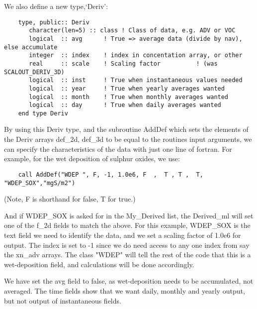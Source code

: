    We also define a new type,`Deriv':

  \begin{small}\begin{verbatim}
    type, public:: Deriv
       character(len=5) :: class ! Class of data, e.g. ADV or VOC
       logical  :: avg      ! True => average data (divide by nav), else accumulate
       integer  :: index    ! index in concentation array, or other
       real     :: scale    ! Scaling factor          ! (was SCALOUT_DERIV_3D)
       logical  :: inst     ! True when instantaneous values needed
       logical  :: year     ! True when yearly averages wanted
       logical  :: month    ! True when monthly averages wanted
       logical  :: day      ! True when daily averages wanted
    end type Deriv
  \end{verbatim}
  \end{small}


  By using this Deriv type, and the subroutine AddDef which sets the elements of the
  Deriv arrays
  def\_2d, def\_3d to be equal to the routines input arguments, we can specify the characteristics of the data
  with just one line of fortran. For example, for the wet deposition of
  sulphur oxides, we use:


  \begin{small}\begin{verbatim}
    call AddDef("WDEP ", F, -1, 1.0e6, F  ,  T , T ,  T, "WDEP_SOX","mgS/m2")
  \end{verbatim}
  \end{small}

  (Note, F is shorthand for false, T for true.)\\
  \bigskip


 \noindent
  And if WDEP\_SOX is asked for in the My\_Derived list, the Derived\_ml will
  set one of the f\_2d fields to match the above.
  For this example, WDEP\_SOX is the text field we need to identify the
  data, and we set a scaling factor of 1.0e6 for output. The index
  is set to -1 since we do need access to any one index from say 
  the xn\_adv arrays.
   The class
  "WDEP" will tell the rest of the code that this is a wet-deposition field,
   and  calculations will be done accordingly. 

   We have set the avg field to false, as wet-deposition needs to be accumulated,
   not averaged. The time fields show that we want daily, monthly and yearly
   output, but not output of instantaneous fields.

